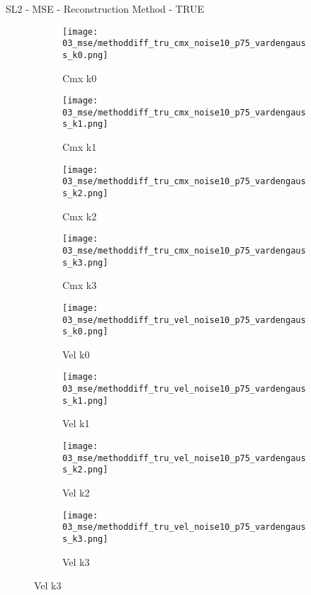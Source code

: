 \documentclass{beamer}
\begin{document}
\begin{frame}{SL2 - MSE - Reconstruction Method - TRUE}{}
\begin{figure}
\begin{subfigure}{0.24\textwidth}
\texttt{[image: 03\_mse/methoddiff\_tru\_cmx\_noise10\_p75\_vardengauss\_k0.png]}
\vspace{-20pt}
\caption*{\tiny Cmx k0}
\end{subfigure}
\begin{subfigure}{0.24\textwidth}
\texttt{[image: 03\_mse/methoddiff\_tru\_cmx\_noise10\_p75\_vardengauss\_k1.png]}
\vspace{-20pt}
\caption*{\tiny Cmx k1}
\end{subfigure}
\begin{subfigure}{0.24\textwidth}
\texttt{[image: 03\_mse/methoddiff\_tru\_cmx\_noise10\_p75\_vardengauss\_k2.png]}
\vspace{-20pt}
\caption*{\tiny Cmx k2}
\end{subfigure}
\begin{subfigure}{0.24\textwidth}
\texttt{[image: 03\_mse/methoddiff\_tru\_cmx\_noise10\_p75\_vardengauss\_k3.png]}
\vspace{-20pt}
\caption*{\tiny Cmx k3}
\end{subfigure}

\begin{subfigure}{0.24\textwidth}
\texttt{[image: 03\_mse/methoddiff\_tru\_vel\_noise10\_p75\_vardengauss\_k0.png]}
\vspace{-20pt}
\caption*{\tiny Vel k0}
\end{subfigure}
\begin{subfigure}{0.24\textwidth}
\texttt{[image: 03\_mse/methoddiff\_tru\_vel\_noise10\_p75\_vardengauss\_k1.png]}
\vspace{-20pt}
\caption*{\tiny Vel k1}
\end{subfigure}
\begin{subfigure}{0.24\textwidth}
\texttt{[image: 03\_mse/methoddiff\_tru\_vel\_noise10\_p75\_vardengauss\_k2.png]}
\vspace{-20pt}
\caption*{\tiny Vel k2}
\end{subfigure}
\begin{subfigure}{0.24\textwidth}
\texttt{[image: 03\_mse/methoddiff\_tru\_vel\_noise10\_p75\_vardengauss\_k3.png]}
\vspace{-20pt}
\caption*{\tiny Vel k3}
\end{subfigure}
\end{figure}
\end{frame}
\end{document}
